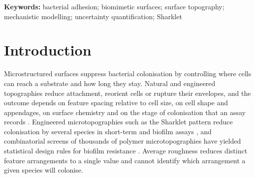 \documentclass[11pt]{article}
\title{\TITLE}
\author{Bianca Cruz Neves$^{1}$ and Antonio Pereira$^{2,*}$\\[4pt]
\small $^{1}$Institute of Chemistry, Federal University of Rio de Janeiro, 21941-909 Rio de Janeiro, Brazil\\
\small $^{2}$Signal Processing Laboratory, Federal University of Par\'a, Bel\'em, PA, Brazil\\
\small $^{*}$Author for correspondence: apereira@ufpa.br; ORCID 0000-0002-0808-1058}
\date{}
\begin{document}
\maketitle

\begin{abstract}
\noindent Dorsal ball python scales bear micrometre-scale imbricated blades and retained fewer \textit{Escherichia coli} and \textit{Staphylococcus aureus} colony-forming units than polystyrene in a published 48~h assay. We reconstructed the blade arrays from published micrographs and linked surface relief to bacterial access, contact energetics and capacity-limited residence, comparing each reconstruction with a flat surface under identical physics. Across 40 reconstructions the model predicted log reductions of \LEc{} for \textit{E.~coli} and \LSa{} for \textit{S.~aureus}, and the rod-shaped species remained more strongly suppressed when the arrival field acted on cell supply or capture alone. Lateral packing of blade columns controlled suppression. At constant projected blade coverage, reducing adjacent-tip spacing from 5.2 to \SI{3.8}{\micrometre} raised the predicted log reduction by \GeomEcCovPit{} for \textit{E.~coli} and \GeomSaCovPit{} for \textit{S.~aureus}, and the increase held without pits, under both alternative arrival formulations and in every paired comparison across 144 surfaces spanning unmeasured tip heights and pit depths. Staggering alternate rows at fixed column separation changed mean suppression by less than 0.002 log. The published replicate counts leave the species difference unresolved ($p=0.085$), so a controlled spacing gradient on keratin is the decisive experimental test of the packing prediction.
\end{abstract}

\noindent\textbf{Keywords:} bacterial adhesion; biomimetic surfaces; surface topography; mechanistic modelling; uncertainty quantification; Sharklet

\section{Introduction}

Microstructured surfaces suppress bacterial colonisation by controlling where cells can reach a substrate and how long they stay. Natural and engineered topographies reduce attachment, reorient cells or rupture their envelopes, and the outcome depends on feature spacing relative to cell size, on cell shape and appendages, on surface chemistry and on the stage of colonisation that an assay records \cite{Ivanova2012,Hasan2013,Wu2018,Scardino2008,Hochbaum2010,Epstein2011}. Engineered microtopographies such as the Sharklet pattern reduce colonisation by several species in short-term and biofilm assays \cite{Chung2007,May2014,Xu2017}, and combinatorial screens of thousands of polymer microtopographies have yielded statistical design rules for biofilm resistance \cite{Romero2025}. Average roughness reduces distinct feature arrangements to a single value and cannot identify which arrangement a given species will colonise.
\end{document}
